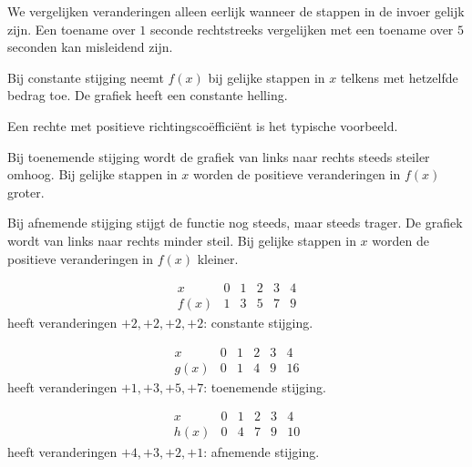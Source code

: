 \documentclass{ximera}
\begin{document}
\begin{opmerking}
We vergelijken veranderingen alleen eerlijk wanneer de stappen in de invoer gelijk zijn.
Een toename over \(1\) seconde rechtstreeks vergelijken met een toename over \(5\) seconden
kan misleidend zijn.
\end{opmerking}




\begin{eigenschap}
Bij constante stijging neemt \(f(x)\) bij gelijke stappen in \(x\)
telkens met hetzelfde bedrag toe. De grafiek heeft een constante helling.

Een rechte met positieve richtingscoëfficiënt is het typische voorbeeld.
\end{eigenschap}

\begin{eigenschap}
Bij toenemende stijging wordt de grafiek van links naar rechts steeds steiler omhoog.
Bij gelijke stappen in \(x\) worden de positieve veranderingen in \(f(x)\) groter.
\end{eigenschap}

\begin{eigenschap}
Bij afnemende stijging stijgt de functie nog steeds, maar steeds trager.
De grafiek wordt van links naar rechts minder steil.
Bij gelijke stappen in \(x\) worden de positieve veranderingen in \(f(x)\) kleiner.
\end{eigenschap}

\begin{voorbeeld}

\[
\begin{array}{c|ccccc}
x&0&1&2&3&4\\ \hline
f(x)&1&3&5&7&9
\end{array}
\]
heeft veranderingen \(+2,+2,+2,+2\): constante stijging.

\[
\begin{array}{c|ccccc}
x&0&1&2&3&4\\ \hline
g(x)&0&1&4&9&16
\end{array}
\]
heeft veranderingen \(+1,+3,+5,+7\): toenemende stijging.

\[
\begin{array}{c|ccccc}
x&0&1&2&3&4\\ \hline
h(x)&0&4&7&9&10
\end{array}
\]
heeft veranderingen \(+4,+3,+2,+1\): afnemende stijging.
\end{voorbeeld}
\end{document}
